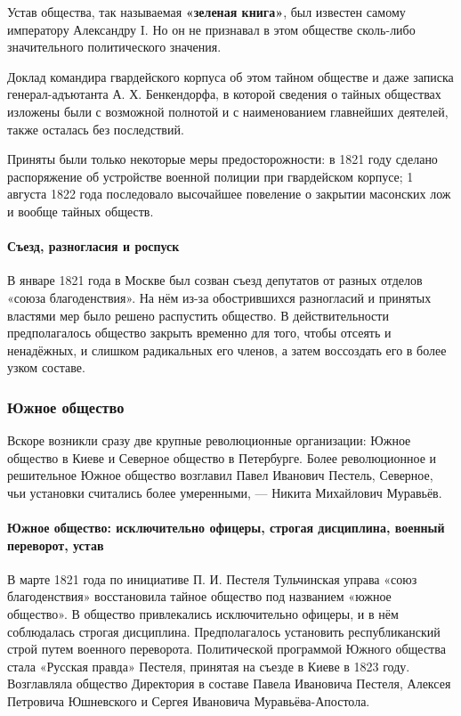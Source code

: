 \documentclass{article}
\begin{document}
Устав общества, так называемая \textbf{«зеленая книга»}, был известен самому императору Александру I. Но он не признавал в этом обществе сколь-либо значительного политического значения.

Доклад командира гвардейского корпуса об этом тайном обществе и даже записка генерал-адъютанта А. Х. Бенкендорфа, в которой сведения о тайных обществах изложены были с возможной полнотой и с наименованием главнейших деятелей, также осталась без последствий.

Приняты были только некоторые меры предосторожности: в 1821 году сделано распоряжение об устройстве военной полиции при гвардейском корпусе; 1 августа 1822 года последовало высочайшее повеление о закрытии масонских лож и вообще тайных обществ.

\paragraph{Съезд, разногласия и роспуск}

В январе 1821 года в Москве был созван съезд депутатов от разных отделов «союза благоденствия». На нём из-за обострившихся разногласий и принятых властями мер было решено распустить общество. В действительности предполагалось общество закрыть временно для того, чтобы отсеять и ненадёжных, и слишком радикальных его членов, а затем воссоздать его в более узком составе.

\subsubsection{Южное общество}

Вскоре возникли сразу две крупные революционные организации: Южное общество в Киеве и Северное общество в Петербурге. Более революционное и решительное Южное общество возглавил Павел Иванович Пестель, Северное, чьи установки считались более умеренными, — Никита Михайлович Муравьёв.

\paragraph{Южное общество: исключительно офицеры, строгая дисциплина, военный переворот, устав}

В марте 1821 года по инициативе П. И. Пестеля Тульчинская управа «союз благоденствия» восстановила тайное общество под названием «южное общество». В общество привлекались исключительно офицеры, и в нём соблюдалась строгая дисциплина. Предполагалось установить республиканский строй путем военного переворота. Политической программой Южного общества стала «Русская правда» Пестеля, принятая на съезде в Киеве в 1823 году. Возглавляла общество Директория в составе Павела Ивановича Пестеля, Алексея Петровича Юшневского и Сергея Ивановича Муравьёва-Апостола. 
\end{document}
